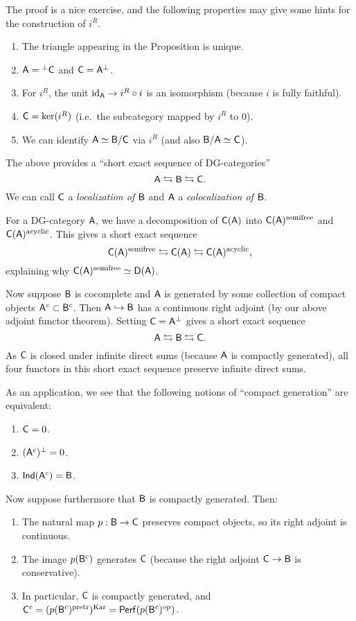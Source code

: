 \documentclass{amsart}
\begin{document}
The proof is a nice exercise, and the following properties may give some hints for the construction of $i^R$.

\begin{enumerate}
	\item The triangle appearing in the Proposition is unique.
	\item $\mathsf{A} = {}^\perp \mathsf{C}$ and $\mathsf{C} = \mathsf{A}^\perp$.
	\item For $i^R$, the unit $\operatorname{id}_{\mathsf{A}} \to i^R \circ i$ is an isomorphism (because $i$ is fully faithful).
	\item $\mathsf{C} = \ker(i^R)$ (i.e.\ the subcategory mapped by $i^R$ to $0$).
	\item We can identify $\mathsf{A} \simeq \mathsf{B} / \mathsf{C}$ via $i^R$ (and also $\mathsf{B} / \mathsf{A} \simeq \mathsf{C}$).
\end{enumerate}

The above provides a ``short exact sequence of DG-categories''
\[
	\mathsf{A} \leftrightarrows \mathsf{B} \leftrightarrows \mathsf{C}.
\]
We can call $\mathsf{C}$ a \emph{localization of $\mathsf{B}$} and $\mathsf{A}$ a \emph{colocalization of $\mathsf{B}$}.

\begin{ex}
	For a DG-category $\mathsf{A}$, we have a decomposition of $\mathsf{C}(\mathsf{A})$ into $\mathsf{C}(\mathsf{A})^{\mathrm{semifree}}$ and $\mathsf{C}(\mathsf{A})^{\mathrm{acyclic}}$.
	This gives a short exact sequence
	\[
		\mathsf{C}(\mathsf{A})^{\mathrm{semifree}} \leftrightarrows \mathsf{C}(\mathsf{A}) \leftrightarrows \mathsf{C}(\mathsf{A})^{\mathrm{acyclic}},
	\]
	explaining why $\mathsf{C}(\mathsf{A})^{\mathrm{semifree}} \simeq \mathsf{D}(\mathsf{A})$.
\end{ex}

Now suppose $\mathsf{B}$ is cocomplete and $\mathsf{A}$ is generated by some collection of compact objects $\mathsf{A}^c \subset \mathsf{B}^c$.
Then $\mathsf{A} \hookrightarrow \mathsf{B}$ has a continuous right adjoint (by our above adjoint functor theorem).
Setting $\mathsf{C} = \mathsf{A}^\perp$ gives a short exact sequence
\[
	\mathsf{A} \leftrightarrows \mathsf{B} \leftrightarrows \mathsf{C}.
\]
As $\mathsf{C}$ is closed under infinite direct sums (because $\mathsf{A}$ is compactly generated), all four functors in this short exact sequence preserve infinite direct sums.

As an application, we see that the following notions of ``compact generation'' are equivalent:
\begin{enumerate}
	\item $\mathsf{C} = 0$.
	\item $(\mathsf{A}^c)^\perp = 0$.
	\item $\mathsf{Ind}(\mathsf{A}^c) = \mathsf{B}$.
\end{enumerate}

Now suppose furthermore that $\mathsf{B}$ is compactly generated.
Then:
\begin{enumerate}
	\item The natural map $p: \mathsf{B} \to \mathsf{C}$ preserves compact objects, so its right adjoint is continuous.
	\item The image $p(\mathsf{B}^c)$ generates $\mathsf{C}$ (because the right adjoint $\mathsf{C} \to \mathsf{B}$ is conservative).
	\item In particular, $\mathsf{C}$ is compactly generated, and $\mathsf{C}^c = (p(\mathsf{B}^c)^{\mathrm{pretr}})^{\mathrm{Kar}} = \mathsf{Perf}(p(\mathsf{B}^c)^{\mathrm{op}})$.
\end{enumerate}
\end{document}
